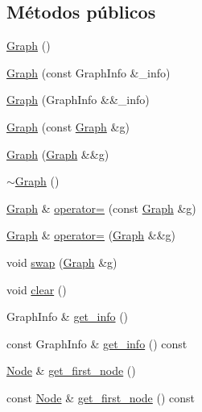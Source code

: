 \subsection*{Métodos públicos}
\begin{DoxyCompactItemize}
\item 
\hyperlink{class_designar_1_1_graph_a606f7514b8036679207da8a09ddfa6bd}{Graph} ()
\item 
\hyperlink{class_designar_1_1_graph_a61f5be7345295aa375f3a329ded36c17}{Graph} (const Graph\+Info \&\+\_\+info)
\item 
\hyperlink{class_designar_1_1_graph_a14f42f1511cc6e9edf7f54f656febf1e}{Graph} (Graph\+Info \&\&\+\_\+info)
\item 
\hyperlink{class_designar_1_1_graph_a4390fe2f03a3972a42c91e99c5570781}{Graph} (const \hyperlink{class_designar_1_1_graph}{Graph} \&g)
\item 
\hyperlink{class_designar_1_1_graph_a7c40e70047c42aaf71faa4739b87a10c}{Graph} (\hyperlink{class_designar_1_1_graph}{Graph} \&\&g)
\item 
\hyperlink{class_designar_1_1_graph_a2ea20f9cb46279210e1eadaebcfe27f0}{$\sim$\+Graph} ()
\item 
\hyperlink{class_designar_1_1_graph}{Graph} \& \hyperlink{class_designar_1_1_graph_a5f0a5acb7b0d5fbabd60294d40c804fa}{operator=} (const \hyperlink{class_designar_1_1_graph}{Graph} \&g)
\item 
\hyperlink{class_designar_1_1_graph}{Graph} \& \hyperlink{class_designar_1_1_graph_a6b6641789f049bfd98761cb0abaa9d60}{operator=} (\hyperlink{class_designar_1_1_graph}{Graph} \&\&g)
\item 
void \hyperlink{class_designar_1_1_graph_a84de29ab3f219f556a833ad21ab274d2}{swap} (\hyperlink{class_designar_1_1_graph}{Graph} \&g)
\item 
void \hyperlink{class_designar_1_1_graph_acfebca533d00dae0c40b0dd88f64296c}{clear} ()
\item 
Graph\+Info \& \hyperlink{class_designar_1_1_graph_a5b84c02e86c7887333df2d8934079678}{get\+\_\+info} ()
\item 
const Graph\+Info \& \hyperlink{class_designar_1_1_graph_adfbae301b6a211adaf1919bc41db176a}{get\+\_\+info} () const
\item 
\hyperlink{class_designar_1_1_graph_a5dfc7dba9d092ac489c72e40390c37d0}{Node} \& \hyperlink{class_designar_1_1_graph_ab9f34a6b6160f9e66a3103c78b13d7d6}{get\+\_\+first\+\_\+node} ()
\item 
const \hyperlink{class_designar_1_1_graph_a5dfc7dba9d092ac489c72e40390c37d0}{Node} \& \hyperlink{class_designar_1_1_graph_a2c27cdec559e9773deebec6f1af25a99}{get\+\_\+first\+\_\+node} () const

\end{DoxyCompactItemize}
